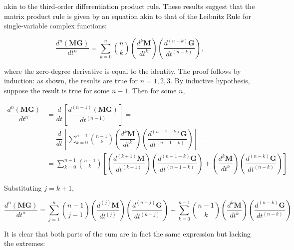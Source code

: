 	\noindent akin to the third-order differentiation product rule. These results suggest that the matrix product rule is given by an equation akin to that of the Leibnitz Rule for single-variable complex functions:

\begin{equation} \dfrac{d^n\left(\mathbf{MG}\right)}{dt^n} = \sum\limits_{k=0}^{n} {n\choose k} \left(\dfrac{d^k \mathbf{M}}{dt^k}\right)  \left(\dfrac{d^{\left(n-k\right)} \mathbf{G}}{dt^{\left(n-k\right)}}\right), \end{equation}

	where the zero-degree derivative is equal to the identity. The proof follows by induction: as shown, the results are true for $n=1,2,3$. By inductive hypothesis, suppose the result is true for some $n-1$. Then for some $n$,

\begin{align}
	 \dfrac{d^n\left(\mathbf{MG}\right)}{dt^n}
	&= \dfrac{d}{dt}\left[\dfrac{d^{\left(n-1\right)} \left(\mathbf{MG}\right)}{dt^{\left(n-1\right)}}\right] = \nonumber\\[3mm]
	&= \dfrac{d}{dt}\left[\sum\limits_{k=0}^{n-1} {n-1\choose k} \left(\dfrac{d^k \mathbf{M}}{dt^k}\right)  \left(\dfrac{d^{\left(n-1-k\right)} \mathbf{G}}{dt^{\left(n-1-k\right)}}\right)\right] = \nonumber\\[3mm]
	&= \sum\limits_{k=0}^{n-1} {n-1\choose k} \left[\left(\dfrac{d^{\left(k+1\right)} \mathbf{M}}{dt^{\left(k+1\right)}}\right)  \left(\dfrac{d^{\left(n-1-k\right)} \mathbf{G}}{dt^{\left(n-1-k\right)}}\right) + \left(\dfrac{d^k \mathbf{M}}{dt^k}\right)  \left(\dfrac{d^{\left(n-k\right)} \mathbf{G}}{dt^{\left(n-k\right)}}\right)\right]
\end{align}

	Substituting $j = k+1$,

\begin{equation}
	 \dfrac{d^n\left(\mathbf{MG}\right)}{dt^n} = \sum\limits_{j=1}^{n} {n-1\choose j-1} \left(\dfrac{d^{\left(j\right)} \mathbf{M}}{dt^{\left(j\right)}}\right)  \left(\dfrac{d^{\left(n-j\right)} \mathbf{G}}{dt^{\left(n-j\right)}}\right) + \sum\limits_{k=0}^{n-1}{n-1\choose k}\left(\dfrac{d^{k} \mathbf{M}}{dt^k}\right)  \left(\dfrac{d^{\left(n-k\right)} \mathbf{G}}{dt^{\left(n-k\right)}}\right)
\end{equation}

	It is clear that both parts of the sum are in fact the same expression but lacking the extremes:

